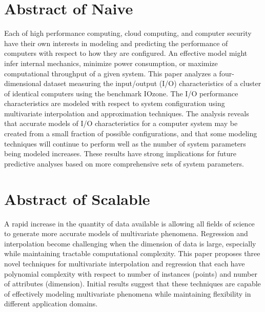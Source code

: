 
\section{Abstract of Naive}
Each of high performance computing, cloud computing, and computer
security have their own interests in modeling and predicting the
performance of computers with respect to how they are configured. An
effective model might infer internal mechanics, minimize power
consumption, or maximize computational throughput of a given
system. This paper analyzes a four-dimensional dataset measuring the
input/output (I/O) characteristics of a cluster of identical computers
using the benchmark IOzone. The I/O performance characteristics are
modeled with respect to system configuration using multivariate
interpolation and approximation techniques. The analysis reveals that
accurate models of I/O characteristics for a computer system may be
created from a small fraction of possible configurations, and that
some modeling techniques will continue to perform well as the number
of system parameters being modeled increases. These results have
strong implications for future predictive analyses based on more
comprehensive sets of system parameters.


\section{Abstract of Scalable}
A rapid increase in the quantity of data available is allowing all fields of science to generate more accurate models of multivariate phenomena. Regression and interpolation become challenging when the dimension of data is large, especially while maintaining tractable computational complexity. This paper proposes three novel techniques for multivariate interpolation and regression that each have polynomial complexity with respect to number of instances (points) and number of attributes (dimension). Initial results suggest that these techniques are capable of effectively modeling multivariate phenomena while maintaining flexibility in different application domains.
